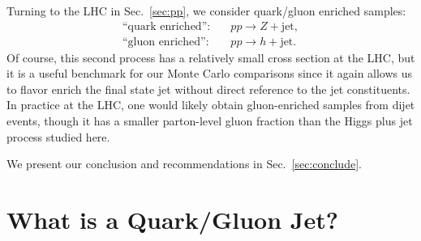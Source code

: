 \documentclass[11pt,letterpaper]{article}
\DeclareRobustCommand{\Sec}[1]{Sec.~\ref{#1}}
\begin{document}
Turning to the LHC in \Sec{sec:pp}, we consider quark/gluon enriched samples:
\begin{align}
\text{``quark enriched''}: \quad & pp \to Z + \text{jet}, \\
\text{``gluon enriched''}: \quad & pp \to h + \text{jet}.
\end{align}
Of course, this second process has a relatively small cross section at the LHC, but it is a useful benchmark for our Monte Carlo comparisons since it again allows us to flavor enrich the final state jet without direct reference to the jet constituents.  In practice at the LHC, one would likely obtain gluon-enriched samples from dijet events, though it has a smaller parton-level gluon fraction than the Higgs plus jet process studied here.

We present our conclusion and recommendations in \Sec{sec:conclude}.

\section{What is a Quark/Gluon Jet?}
\label{sec:quarkgluondef}
\end{document}
